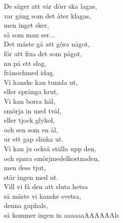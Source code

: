 \documentclass[a6paper, 10pt, twoside]{article}
\begin{document}
\begin{center}
\end{center}
\begin{lyrics}
De säger att vår dörr ska lagas,\\
var gång som det åter klagas,\\
men inget sker,\\
så som man ser...\\
Det måste gå att göra något,\\
för att fixa det som pågot,\\
nu på ett slag,\\
frånochmed idag.
\vspace{5pt}\\
Vi kanske kan tunnla ut,\\
eller spränga krut,\\
Vi kan borra hål,\\
smörja in med tvål,\\
eller tjock glykol,\\
och sen som en ål,\\
ur ett gap slinka ut.
\vspace{5pt}\\
Vi kan ju också ställa upp den,\\
och spara smörjmedelkostnaden,\\
men dess tjut,\\
står ingen med ut.\\
Vill vi få den att sluta hetsa\\
så måste vi kanske svetsa,\\
denna gaphals,\\
så kommer ingen in aaaaaaAAAAAAls
\end{lyrics}
\end{document}
